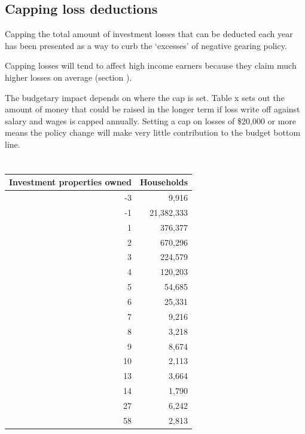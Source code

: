 \documentclass{grattan}\usepackage[]{graphicx}\usepackage[]{color}
\begin{document}
\subsection{Capping loss deductions}

Capping the total amount of investment losses that can be deducted each
year has been presented as a way to curb the `excesses' of negative
gearing policy.

Capping losses will tend to affect high income earners because they
claim much higher losses on average (section ).

The budgetary impact depends on where the cap is set. Table x sets out
the amount of money that could be raised in the longer term if loss
write off against salary and wages is capped annually. Setting a cap on
losses of \$20,000 or more means the policy change will make very little
contribution to the budget bottom line.






\section{}

\begin{table}[!h]
\begin{center}
\begin{tabularx}{\linewidth}{rr}
  \toprule
{\textbf{Investment properties owned}} & {\textbf{Households}} \\ 
  \midrule
 -3 & 9,916 \\ 
   -1 & 21,382,333 \\ 
    1 & 376,377 \\ 
    2 & 670,296 \\ 
    3 & 224,579 \\ 
    4 & 120,203 \\ 
    5 & 54,685 \\ 
    6 & 25,331 \\ 
    7 & 9,216 \\ 
    8 & 3,218 \\ 
    9 & 8,674 \\ 
   10 & 2,113 \\ 
   13 & 3,664 \\ 
   14 & 1,790 \\ 
   27 & 6,242 \\ 
   58 & 2,813 \\ 
   \bottomrule
\end{tabularx}

\end{center}
\end{table}
\end{document}
